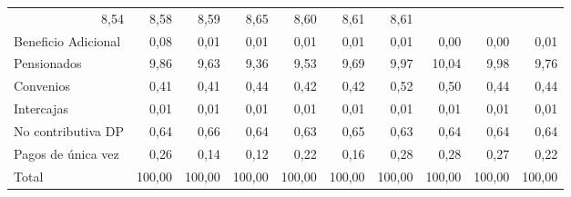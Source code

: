 \begin{tabular}{llllllllll}
  \multicolumn{1}{r}{8,54} &
  \multicolumn{1}{r}{8,58} &
  \multicolumn{1}{r}{8,59} &
  \multicolumn{1}{r}{8,65} &
  \multicolumn{1}{r}{8,60} &
  \multicolumn{1}{r}{8,61} &
  \multicolumn{1}{r}{8,61} \\
\multicolumn{1}{l}{\hspace{1em}Beneficio Adicional} &
  \multicolumn{1}{|r}{0,08} &
  \multicolumn{1}{r}{0,01} &
  \multicolumn{1}{r}{0,01} &
  \multicolumn{1}{r}{0,01} &
  \multicolumn{1}{r}{0,01} &
  \multicolumn{1}{r}{0,01} &
  \multicolumn{1}{r}{0,00} &
  \multicolumn{1}{r}{0,00} &
  \multicolumn{1}{r}{0,01} \\
\multicolumn{1}{l}{\hspace{1em}Pensionados} &
  \multicolumn{1}{|r}{9,86} &
  \multicolumn{1}{r}{9,63} &
  \multicolumn{1}{r}{9,36} &
  \multicolumn{1}{r}{9,53} &
  \multicolumn{1}{r}{9,69} &
  \multicolumn{1}{r}{9,97} &
  \multicolumn{1}{r}{10,04} &
  \multicolumn{1}{r}{9,98} &
  \multicolumn{1}{r}{9,76} \\
\multicolumn{1}{l}{\hspace{1em}Convenios} &
  \multicolumn{1}{|r}{0,41} &
  \multicolumn{1}{r}{0,41} &
  \multicolumn{1}{r}{0,44} &
  \multicolumn{1}{r}{0,42} &
  \multicolumn{1}{r}{0,42} &
  \multicolumn{1}{r}{0,52} &
  \multicolumn{1}{r}{0,50} &
  \multicolumn{1}{r}{0,44} &
  \multicolumn{1}{r}{0,44} \\
\multicolumn{1}{l}{\hspace{1em}Intercajas} &
  \multicolumn{1}{|r}{0,01} &
  \multicolumn{1}{r}{0,01} &
  \multicolumn{1}{r}{0,01} &
  \multicolumn{1}{r}{0,01} &
  \multicolumn{1}{r}{0,01} &
  \multicolumn{1}{r}{0,01} &
  \multicolumn{1}{r}{0,01} &
  \multicolumn{1}{r}{0,01} &
  \multicolumn{1}{r}{0,01} \\
\multicolumn{1}{l}{\hspace{1em}No contributiva DP} &
  \multicolumn{1}{|r}{0,64} &
  \multicolumn{1}{r}{0,66} &
  \multicolumn{1}{r}{0,64} &
  \multicolumn{1}{r}{0,63} &
  \multicolumn{1}{r}{0,65} &
  \multicolumn{1}{r}{0,63} &
  \multicolumn{1}{r}{0,64} &
  \multicolumn{1}{r}{0,64} &
  \multicolumn{1}{r}{0,64} \\
\multicolumn{1}{l}{\hspace{1em}Pagos de única vez} &
  \multicolumn{1}{|r}{0,26} &
  \multicolumn{1}{r}{0,14} &
  \multicolumn{1}{r}{0,12} &
  \multicolumn{1}{r}{0,22} &
  \multicolumn{1}{r}{0,16} &
  \multicolumn{1}{r}{0,28} &
  \multicolumn{1}{r}{0,28} &
  \multicolumn{1}{r}{0,27} &
  \multicolumn{1}{r}{0,22} \\
\multicolumn{1}{l}{\hspace{1em}Total} &
  \multicolumn{1}{|r}{100,00} &
  \multicolumn{1}{r}{100,00} &
  \multicolumn{1}{r}{100,00} &
  \multicolumn{1}{r}{100,00} &
  \multicolumn{1}{r}{100,00} &
  \multicolumn{1}{r}{100,00} &
  \multicolumn{1}{r}{100,00} &
  \multicolumn{1}{r}{100,00} &
  \multicolumn{1}{r}{100,00} \\
\cline{1-10}
\end{tabular}
